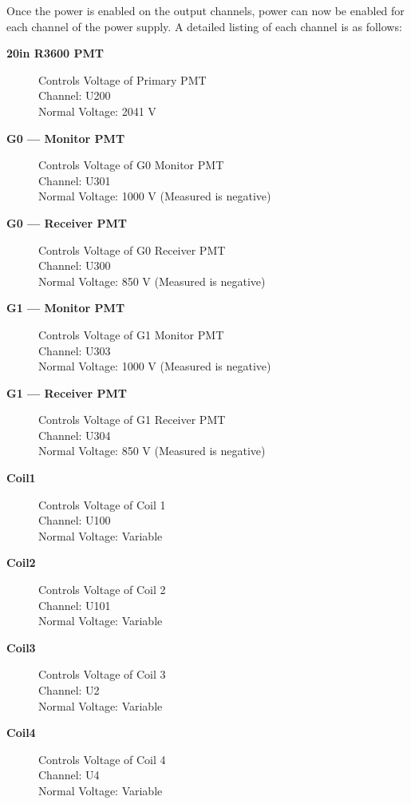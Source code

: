 \documentclass[twoside,letterpaper]{refart}
\begin{document}
Once the power is enabled on the output channels, power can now be enabled for each channel of the power supply. A detailed listing of each channel is as follows:

\begin{description}
	
	\item[\textbf{20in R3600 PMT}] Controls Voltage of Primary PMT \\
	Channel: U200 \\
	Normal Voltage: 2041 V
	
	\item[\textbf{G0 --- Monitor PMT}] Controls Voltage of G0 Monitor PMT \\
	Channel: U301 \\
	Normal Voltage: 1000 V (Measured is negative)
	
	\item[\textbf{G0 --- Receiver PMT}] Controls Voltage of G0 Receiver PMT \\
	Channel: U300 \\
	Normal Voltage: 850 V (Measured is negative)
	
	\item[\textbf{G1 --- Monitor PMT}] Controls Voltage of G1 Monitor PMT \\
	Channel: U303 \\
	Normal Voltage: 1000 V (Measured is negative)
	
	\item[\textbf{G1 --- Receiver PMT}] Controls Voltage of G1 Receiver PMT \\
	Channel: U304 \\
	Normal Voltage: 850 V (Measured is negative)
		
	\item[\textbf{Coil1}] Controls Voltage of Coil 1 \\
	Channel: U100 \\
	Normal Voltage: Variable
	
	\item[\textbf{Coil2}] Controls Voltage of Coil 2 \\
	Channel: U101 \\
	Normal Voltage: Variable
	
	\item[\textbf{Coil3}] Controls Voltage of Coil 3 \\
	Channel: U2 \\
	Normal Voltage: Variable
	
	\item[\textbf{Coil4}] Controls Voltage of Coil 4 \\
	Channel: U4 \\
	Normal Voltage: Variable
	

\end{description}
\end{document}
